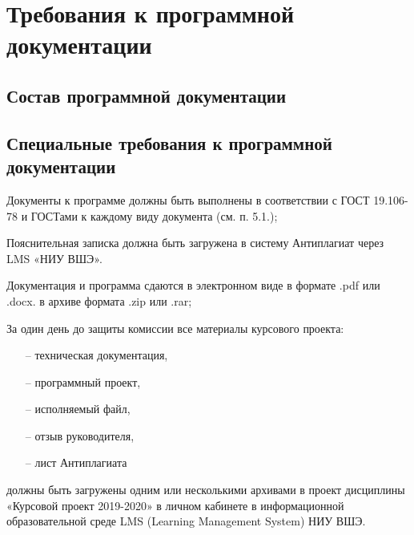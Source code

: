 \section{Требования к программной документации}

\subsection{Состав программной документации}



\subsection{Специальные требования к программной документации}

Документы к программе должны быть выполнены в соответствии с ГОСТ 19.106-78 и ГОСТами к каждому виду документа (см. п. 5.1.);

Пояснительная записка должна быть загружена в систему Антиплагиат через LMS «НИУ ВШЭ».

Документация и программа сдаются в электронном виде в формате .pdf или .docx. в архиве формата .zip или .rar;

За один день до защиты комиссии все материалы курсового проекта:
\begin{itemize}
    \item[--] техническая документация,
    \item[--] программный проект,
    \item[--] исполняемый файл,
    \item[--] отзыв руководителя,
    \item[--] лист Антиплагиата
\end{itemize}
должны быть загружены одним или несколькими архивами в проект дисциплины «Курсовой проект 2019-2020» в личном кабинете в информационной образовательной среде LMS (Learning Management System) НИУ ВШЭ.
